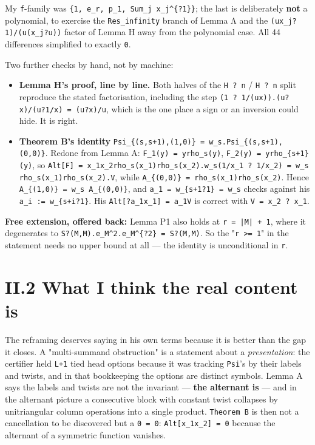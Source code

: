 \documentclass[11pt,a4paper]{article}
\begin{document}
My \mbox{\texttt{f}}-family was \mbox{\texttt{\{1, e\_r, p\_1, Sum\_j x\_j\textasciicircum{}\{?1\}\}}}; the last is deliberately \textbf{not} a polynomial, to exercise the \mbox{\texttt{Res\_infinity}} branch of Lemma Λ and the \mbox{\texttt{(ux\_j?1)/(u(x\_j?u))}} factor of Lemma H away from the polynomial case. All 44 differences simplified to exactly \mbox{\texttt{0}}.

Two further checks by hand, not by machine:

\begin{itemize}
\item \textbf{Lemma H's proof, line by line.} Both halves of the \mbox{\texttt{H ? n}} / \mbox{\texttt{H ? n}} split reproduce the stated factorisation, including the step \mbox{\texttt{(1 ? 1/(ux)).(u?x)/(u?1/x) = (u?x)/u}}, which is the one place a sign or an inversion could hide. It is right.
\item \textbf{Theorem B's identity} \mbox{\texttt{Psi\_\{(s,s+1),(1,0)\} = w\_s.Psi\_\{(s,s+1),(0,0)\}}}. Redone from Lemma A: \mbox{\texttt{F\_1(y) = yrho\_s(y)}}, \mbox{\texttt{F\_2(y) = yrho\_\{s+1\}(y)}}, so \mbox{\texttt{Alt[F] = x\_1x\_2rho\_s(x\_1)rho\_s(x\_2).w\_s(1/x\_1 ? 1/x\_2) = w\_s rho\_s(x\_1)rho\_s(x\_2).V}}, while \mbox{\texttt{A\_\{(0,0)\} = rho\_s(x\_1)rho\_s(x\_2)}}. Hence \mbox{\texttt{A\_\{(1,0)\} = w\_s A\_\{(0,0)\}}}, and \mbox{\texttt{a\_1 = w\_\{s+1?1\} = w\_s}} checks against his \mbox{\texttt{a\_i := w\_\{s+i?1\}}}. His \mbox{\texttt{Alt[?a\_1x\_1] = a\_1V}} is correct with \mbox{\texttt{V = x\_2 ? x\_1}}.
\end{itemize}

\textbf{Free extension, offered back:} Lemma P1 also holds at \mbox{\texttt{r = |M| + 1}}, where it degenerates to \mbox{\texttt{S?(M,M).e\_M\textasciicircum{}2.e\_M\textasciicircum{}\{?2\} = S?(M,M)}}. So the "\mbox{\texttt{r >= 1}}" in the statement needs no upper bound at all --- the identity is unconditional in \mbox{\texttt{r}}.

\section*{II.2 What I think the real content is}

The reframing deserves saying in his own terms because it is better than the gap it closes. A "multi-summand obstruction" is a statement about a \emph{presentation}: the certifier held \mbox{\texttt{L+1}} tied head options because it was tracking \mbox{\texttt{Psi}}'s by their labels and twists, and in that bookkeeping the options are distinct symbols. Lemma A says the labels and twists are not the invariant --- \textbf{the alternant is} --- and in the alternant picture a consecutive block with constant twist collapses by unitriangular column operations into a single product. \mbox{\texttt{Theorem B}} is then not a cancellation to be discovered but a \mbox{\texttt{0 = 0}}: \mbox{\texttt{Alt[x\_1x\_2] = 0}} because the alternant of a symmetric function vanishes.
\end{document}
